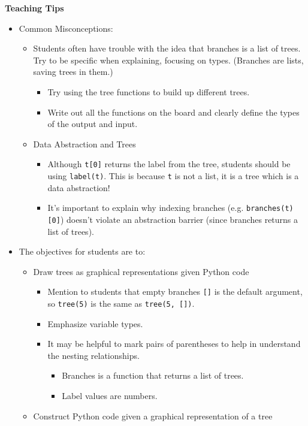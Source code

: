 \begin{guide}
	\begin{blocksection}
	\textbf{Teaching Tips}
	\begin{itemize}
			\item Common Misconceptions:
			\begin{itemize}
				\item Students often have trouble with the idea that branches is a list of trees. Try to be specific when explaining, focusing on types. (Branches are lists, saving trees in them.)
				\begin{itemize}
					\item Try using the tree functions to build up different trees.
					\item Write out all the functions on the board and clearly define the types of the output and input.
				\end{itemize}
				\item Data Abstraction and Trees
				\begin{itemize}
					\item Although \lstinline{t[0]} returns the label from the tree, students should be using \lstinline{label(t)}. This is because \lstinline{t} is not a list, it is a tree which is a data abstraction!
					\item It’s important to explain why indexing branches (e.g. \lstinline{branches(t)[0]}) doesn't violate an abstraction barrier (since branches returns a list of trees).
				\end{itemize}
			\end{itemize}
			\item The objectives for students are to:
			\begin{itemize}
				\item Draw trees as graphical representations given Python code
				\begin{itemize}
					\item Mention to students that empty branches \lstinline{[]} is the default argument, so \lstinline{tree(5)} is the same as \lstinline{tree(5, [])}.
					\item Emphasize variable types.
					\item It may be helpful to mark pairs of parentheses to help in understand the nesting relationships.
					\begin{itemize}
						\item Branches is a function that returns a list of trees.
						\item Label values are numbers.
					\end{itemize}
				\end{itemize}
				\item Construct Python code given a graphical representation of a tree
			\end{itemize}
	\end{itemize}
	\end{blocksection}
\end{guide}
